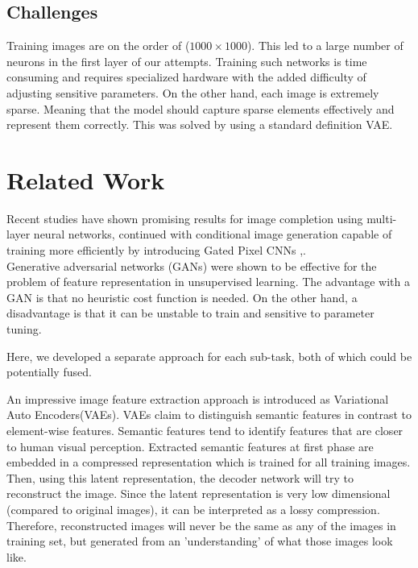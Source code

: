 \documentclass[journal]{IEEEtran}
\begin{document}
\subsection*{Challenges}
Training images are on the order of ($1000\times1000$). This led to a large number of neurons in the first layer of our attempts. Training such networks is time consuming and requires specialized hardware with the added difficulty of adjusting sensitive parameters.
On the other hand, each image is extremely sparse. Meaning that the model should capture sparse elements effectively and represent them correctly. This was solved by using a standard definition VAE.

\section{Related Work}

Recent studies have shown promising results for image completion using multi-layer neural networks\cite{pixelrnn}, continued with conditional image generation capable of training more efficiently by introducing Gated Pixel CNNs \cite{pixel-cnn++} ,\cite{pixelcnn}.\\
Generative adversarial networks (GANs) were shown to be effective for the problem of feature representation in unsupervised learning.\cite{DCGAN}
The advantage with a GAN is that no heuristic cost function is needed. On the other hand, a disadvantage is that it can be unstable to train and sensitive to parameter tuning.

Here, we developed a separate approach for each sub-task, both of which could be potentially fused.

An impressive image feature extraction approach is introduced as Variational Auto Encoders(VAEs). VAEs claim to distinguish semantic features in contrast to element-wise features. Semantic features tend to identify features that are closer to human visual perception\cite{AEVB}.
Extracted semantic features at first phase are embedded in a compressed representation which is trained for all training images. Then, using this latent representation, the decoder network will try to reconstruct the image. Since the latent representation is very low dimensional (compared to original images), it can be interpreted as a lossy compression. Therefore, reconstructed images will never be the same as any of the images in training set, but generated from an 'understanding' of what those images look like.\\
\end{document}

